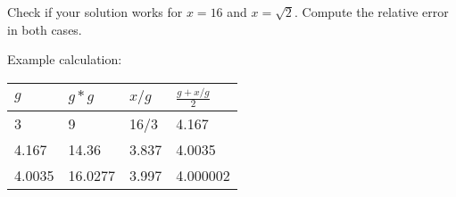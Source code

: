 \documentclass[a4paper,12pt]{article}
\begin{document}
\begin{enumerate}
	Check if your solution works for $x = 16$ and $x = \sqrt{2}$. Compute the relative error in both cases.
	
	Example calculation:

	\begin{table}[!h]
		\centering
		\begin{tabular}{llll}
			\toprule
			$g$  & $g*g$   & $x/g$ & $\frac{g + x/g}{2}$\\
			\midrule
			3    & 9       & 16/3  & 4.167             \\
			4.167  & 14.36   & 3.837 & 4.0035          \\
			4.0035 & 16.0277 & 3.997 & 4.000002       \\
			\bottomrule
		\end{tabular}
	\end{table}

\end{enumerate}
\end{document}
